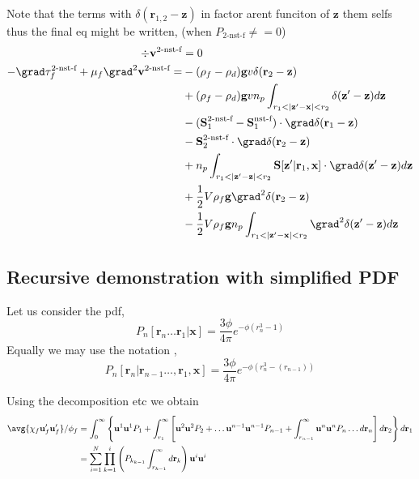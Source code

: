 Note that the terms with $\delta(\textbf{r}_{1,2} - \textbf{z})$ in factor arent funciton of $\textbf{z}$ them selfs thus the final eq might be written, (when $P_\text{2-nst-f}\neq =0$)
\begin{align}
     \div \textbf{v}^\text{2-nst-f} &= 0 \\
    - \grad\tau_f^\text{2-nst-f} 
    +\mu_f \grad^2\textbf{v}^\text{2-nst-f}
    = 
    &- (\rho_f - \rho_d) \textbf{g} v \delta(\textbf{r}_2 - \textbf{z}) \\
    &+ (\rho_f - \rho_d) \textbf{g} v n_p \int_{r_1<|\textbf{z}' - \textbf{x}| <r_2} \delta(\textbf{z}'-\textbf{z})d\textbf{z} \\
    &-  (\textbf{S}_{1}^\text{2-nst-f} - \textbf{S}_{1}^\text{nst-f})  \cdot \grad \delta(\textbf{r}_1 - \textbf{z}) \\
    &-  \textbf{S}_2^\text{2-nst-f}  \cdot \grad \delta(\textbf{r}_2 - \textbf{z}) \\
    &+  n_p \int_{r_1 < |\textbf{z}' - \textbf{z}|<r_2}\textbf{S}[\textbf{z}'|\textbf{r}_1,\textbf{x}] \cdot \grad\delta(\textbf{z}'-\textbf{z}) d\textbf{z}\\
    &+ \frac{1}{2} V \rho_f \textbf{g}\grad^2\delta(\textbf{r}_2 - \textbf{z}) \\
    &- \frac{1}{2} V \rho_f \textbf{g} n_p \int_{r_1<|\textbf{z}' - \textbf{x}| <r_2} \grad^2\delta(\textbf{z}'-\textbf{z})d\textbf{z} \\
\end{align}


\subsection{Recursive demonstration with simplified PDF}
Let us consider the pdf, 
\begin{equation}
    P_n [\textbf{r}_n \ldots \textbf{r}_1|\textbf{x}]
    = 
    \frac{3\phi}{4\pi} e^{-\phi (r_n^3 -  1)}
\end{equation}
Equally we may use the notation , 
\begin{equation}
    P_n [\textbf{r}_n | \textbf{r}_{n-1} \ldots, \textbf{r}_1, \textbf{x}]
    = 
    \frac{3\phi}{4\pi} e^{-\phi (r_n^3 -  (r_{n-1}))}
\end{equation}

Using the decomposition etc we obtain 
\begin{align}
    \avg{\chi_f \textbf{u}_f'\textbf{u}_f'}/ \phi_f
    &=
    \int_{0}^{\infty}
    \left\{
        \textbf{u}^1
        \textbf{u}^1
        P_1 
        +
        \int_{r_1}^{\infty}
        \left[
        \textbf{u}^2
        \textbf{u}^2
        P_2 
        + \ldots
        \textbf{u}^{n-1}
        \textbf{u}^{n-1}
        P_{n-1}
        + 
        \int_{r_{n-1}}^{\infty}
        \textbf{u}^n
        \textbf{u}^n
        P_n
        \ldots
        d\textbf{r}_n 
        \right]
        d\textbf{r}_2
    \right\}
    d\textbf{r}_1 \\
    &=
    \sum_{i=1}^N 
    \prod_{k=1}^i \left(
        P_{k_{k-1}}
        \int_{r_{k-1}}^{\infty}
        d\textbf{r}_k 
    \right)
    \textbf{u}^i
    \textbf{u}^i
\end{align}


